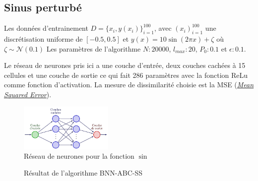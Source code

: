 \documentclass[french,12pt]{article}
\let\oldsubsection\subsection%
\renewcommand{\subsection}{%
  \renewcommand{\theequation}{\thesubsection.\arabic{equation}}%
  \oldsubsection}%
\begin{document}
\subsection{Sinus perturbé}


Les données d'entrainement $D = \{x_i , y(x_i)\}_{i = 1}^{100}$, avec $(x_i)_{i = 1}^{100}$
une discrétisation uniforme de $[-0.5, 0.5]$ et $y(x) = 10 \sin(2 \pi x) + \zeta$ où $\zeta \sim \mathcal{N}(0.1)$
Les paramètres de l'algorithme $N : 20000$, $l_{max} : 20$, $P_0 : 0.1$ et $\epsilon : 0.1$.

Le réseau de neurones pris ici a une couche d'entrée, deux couches cachées à 15 cellules et une couche de sortie ce qui
fait 286 paramètres avec la fonction ReLu comme fonction d'activation. La mesure de dissimilarité
choisie est la MSE (\href{https://en.wikipedia.org/wiki/Mean_squared_error}{\textit{Mean Squared Error}}).


\begin{figure}[H]
    \centering
    \includegraphics[width = 0.4\textwidth]{FNN/Images/fnnSin/fnnSin_page-0001.jpg}
    \caption[short]{Réseau de neurones pour la fonction $\sin$}
\end{figure}

\begin{figure}[H]
    \centering
    \caption[short]{Résultat de l'algorithme BNN-ABC-SS}
\end{figure}
\end{document}
